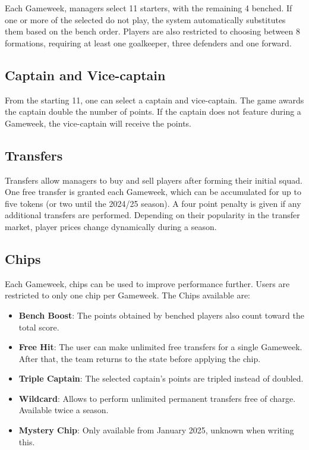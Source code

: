 Each Gameweek, managers select 11 starters, with the remaining 4 benched. If one or more of the selected do not play, the system automatically substitutes them based on the bench order. Players are also restricted to choosing between 8 formations, requiring at least one goalkeeper, three defenders and one forward.

\subsection{Captain and Vice-captain}

From the starting 11, one can select a captain and vice-captain. The game awards the captain double the number of points. If the captain does not feature during a Gameweek, the vice-captain will receive the points.

\subsection{Transfers}

Transfers allow managers to buy and sell players after forming their initial squad. One free transfer is granted each Gameweek, which can be accumulated for up to five tokens (or two until the 2024/25 season). A four point penalty is given if any additional transfers are performed. Depending on their popularity in the transfer market, player prices change dynamically during a season.

\subsection{Chips}

Each Gameweek, chips can be used to improve performance further. Users are restricted to only one chip per Gameweek. The Chips available are:
\begin{itemize}
    \item \textbf{Bench Boost}: The points obtained by benched players also count toward the total score.
    \item \textbf{Free Hit}: The user can make unlimited free transfers for a single Gameweek. After that, the team returns to the state before applying the chip. 
    \item \textbf{Triple Captain}: The selected captain's points are tripled instead of doubled.
    \item \textbf{Wildcard}: Allows to perform unlimited permanent transfers free of charge. Available twice a season. 
    \item \textbf{Mystery Chip}: Only available from January 2025, unknown when writing this.
\end{itemize}

